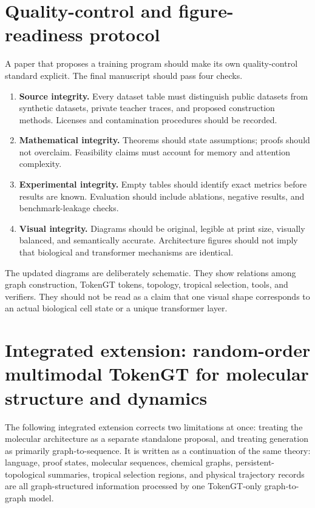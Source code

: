 \documentclass[11pt]{article}
\newcommand{\1}{\mathbf{1}}
\begin{document}
\section{Quality-control and figure-readiness protocol}
\label{sec:qa-protocol}

A paper that proposes a training program should make its own quality-control standard explicit. The final manuscript should pass four checks.

\begin{enumerate}
\item \textbf{Source integrity.} Every dataset table must distinguish public datasets from synthetic datasets, private teacher traces, and proposed construction methods. Licenses and contamination procedures should be recorded.
\item \textbf{Mathematical integrity.} Theorems should state assumptions; proofs should not overclaim. Feasibility claims must account for memory and attention complexity.
\item \textbf{Experimental integrity.} Empty tables should identify exact metrics before results are known. Evaluation should include ablations, negative results, and benchmark-leakage checks.
\item \textbf{Visual integrity.} Diagrams should be original, legible at print size, visually balanced, and semantically accurate. Architecture figures should not imply that biological and transformer mechanisms are identical.
\end{enumerate}

The updated diagrams are deliberately schematic. They show relations among graph construction, TokenGT tokens, topology, tropical selection, tools, and verifiers. They should not be read as a claim that one visual shape corresponds to an actual biological cell state or a unique transformer layer.



\section{Integrated extension: random-order multimodal TokenGT for molecular structure and dynamics}
\label{sec:integrated_ugm_extension}

The following integrated extension corrects two limitations at once: treating the molecular architecture as a separate standalone proposal, and treating generation as primarily graph-to-sequence. It is written as a continuation of the same theory: language, proof states, molecular sequences, chemical graphs, persistent-topological summaries, tropical selection regions, and physical trajectory records are all graph-structured information processed by one TokenGT-only graph-to-graph model.
\end{document}
